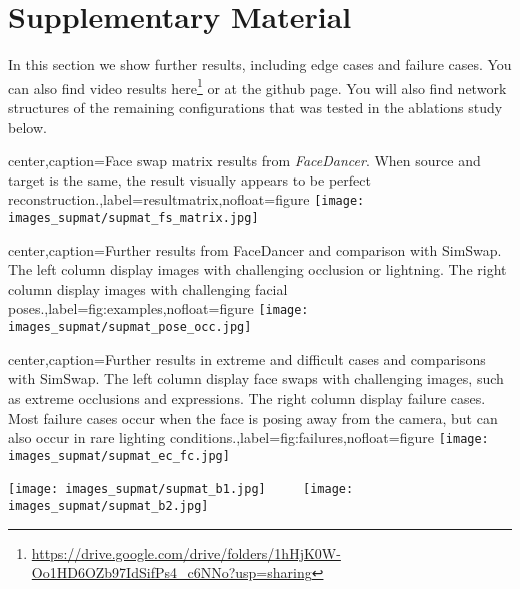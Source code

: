 \documentclass[10pt,twocolumn,letterpaper]{article}
\newcommand{\fti}[1]{\textit{FaceDancer}{#1}}
\begin{document}
{\small


}


\newpage

\onecolumn
\section*{Supplementary Material}
In this section we show further results, including edge cases and failure cases. You can also find video results here\footnote{\url{https://drive.google.com/drive/folders/1hHjK0W-Oo1HD6OZb97IdSifPs4_c6NNo?usp=sharing}} or at the github page. You will also find network structures of the remaining configurations that was tested in the ablations study below.

\begin{adjustbox}{center,caption={Face swap matrix results from \fti . When source and target is the same, the result visually appears to be perfect reconstruction.},label={resultmatrix},nofloat=figure}
\texttt{[image: images\_supmat/supmat\_fs\_matrix.jpg]}
\end{adjustbox}

\begin{adjustbox}{center,caption={Further results from FaceDancer and comparison with SimSwap. The left column display images with challenging occlusion or lightning. The right column display images with challenging facial poses.},label={fig:examples},nofloat=figure}
\texttt{[image: images\_supmat/supmat\_pose\_occ.jpg]}
\end{adjustbox}

\begin{adjustbox}{center,caption={Further results in extreme and difficult cases and comparisons with SimSwap. The left column display face swaps with challenging images, such as extreme occlusions and expressions. The right column display failure cases. Most failure cases occur when the face is posing away from the camera, but can also occur in rare lighting conditions.},label={fig:failures},nofloat=figure}
\texttt{[image: images\_supmat/supmat\_ec\_fc.jpg]}
\end{adjustbox}



\begin{figure*}[htp]
\centering
\texttt{[image: images\_supmat/supmat\_b1.jpg]} ~~~~
\texttt{[image: images\_supmat/supmat\_b2.jpg]}
\caption{Overview of baseline 1 and baseline 2 of the \fti.}
\label{fig:baseline1}
\end{figure*}
\end{document}
